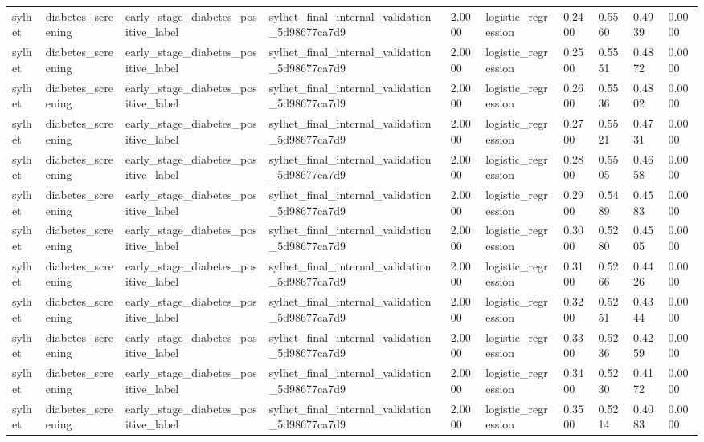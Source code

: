 \begin{tabular}{llllllllll}
sylhet & diabetes\_screening & early\_stage\_diabetes\_positive\_label & sylhet\_final\_internal\_validation\_5d98677ca7d9 & 2.0000 & logistic\_regression & 0.2400 & 0.5560 & 0.4939 & 0.0000 \\
sylhet & diabetes\_screening & early\_stage\_diabetes\_positive\_label & sylhet\_final\_internal\_validation\_5d98677ca7d9 & 2.0000 & logistic\_regression & 0.2500 & 0.5551 & 0.4872 & 0.0000 \\
sylhet & diabetes\_screening & early\_stage\_diabetes\_positive\_label & sylhet\_final\_internal\_validation\_5d98677ca7d9 & 2.0000 & logistic\_regression & 0.2600 & 0.5536 & 0.4802 & 0.0000 \\
sylhet & diabetes\_screening & early\_stage\_diabetes\_positive\_label & sylhet\_final\_internal\_validation\_5d98677ca7d9 & 2.0000 & logistic\_regression & 0.2700 & 0.5521 & 0.4731 & 0.0000 \\
sylhet & diabetes\_screening & early\_stage\_diabetes\_positive\_label & sylhet\_final\_internal\_validation\_5d98677ca7d9 & 2.0000 & logistic\_regression & 0.2800 & 0.5505 & 0.4658 & 0.0000 \\
sylhet & diabetes\_screening & early\_stage\_diabetes\_positive\_label & sylhet\_final\_internal\_validation\_5d98677ca7d9 & 2.0000 & logistic\_regression & 0.2900 & 0.5489 & 0.4583 & 0.0000 \\
sylhet & diabetes\_screening & early\_stage\_diabetes\_positive\_label & sylhet\_final\_internal\_validation\_5d98677ca7d9 & 2.0000 & logistic\_regression & 0.3000 & 0.5280 & 0.4505 & 0.0000 \\
sylhet & diabetes\_screening & early\_stage\_diabetes\_positive\_label & sylhet\_final\_internal\_validation\_5d98677ca7d9 & 2.0000 & logistic\_regression & 0.3100 & 0.5266 & 0.4426 & 0.0000 \\
sylhet & diabetes\_screening & early\_stage\_diabetes\_positive\_label & sylhet\_final\_internal\_validation\_5d98677ca7d9 & 2.0000 & logistic\_regression & 0.3200 & 0.5251 & 0.4344 & 0.0000 \\
sylhet & diabetes\_screening & early\_stage\_diabetes\_positive\_label & sylhet\_final\_internal\_validation\_5d98677ca7d9 & 2.0000 & logistic\_regression & 0.3300 & 0.5236 & 0.4259 & 0.0000 \\
sylhet & diabetes\_screening & early\_stage\_diabetes\_positive\_label & sylhet\_final\_internal\_validation\_5d98677ca7d9 & 2.0000 & logistic\_regression & 0.3400 & 0.5230 & 0.4172 & 0.0000 \\
sylhet & diabetes\_screening & early\_stage\_diabetes\_positive\_label & sylhet\_final\_internal\_validation\_5d98677ca7d9 & 2.0000 & logistic\_regression & 0.3500 & 0.5214 & 0.4083 & 0.0000 \\

\end{tabular}
